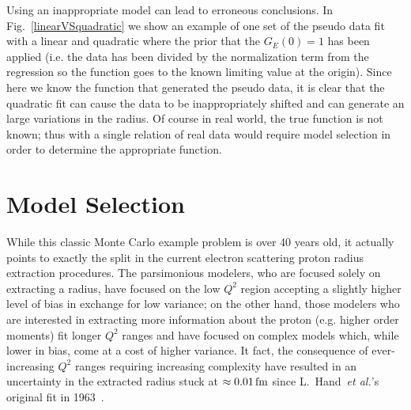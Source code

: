 \documentclass[10pt,superscriptaddress,aps,prc,twocolumn]{revtex4-1}
\begin{document}
Using an inappropriate model can lead to erroneous conclusions.
In Fig.~\ref{linearVSquadratic} we show an
example of one set of the pseudo data fit with a linear and quadratic where the prior that the
$G_E(0)=1$ has been applied (i.e. the data has been divided by the normalization term from the regression
so the function goes to the known limiting value at the origin).
Since here we know the function that generated the pseudo data, it is clear that the quadratic
fit can cause the data to be inappropriately shifted and can generate an large variations
in the radius. 
Of course in real world, the true function is not known; thus with a single relation of real data
would require model selection in order to determine the appropriate function. 

\section{Model Selection}

While this classic Monte Carlo example problem is over 40 years old, it actually points to exactly the split in 
the current electron scattering proton radius extraction procedures.     The parsimonious modelers, who are 
focused solely on extracting a radius, have focused on the low $Q^2$ region accepting a slightly higher 
level of bias in exchange for low variance; on the other hand, those modelers who are interested in extracting more information 
about the proton (e.g. higher order moments) fit longer $Q^2$ ranges and have
focused on complex models which, while lower in bias, come at a cost of higher variance.  
It fact, the consequence of ever-increasing $Q^2$ ranges requiring increasing complexity have resulted in
an uncertainty in the extracted radius 
stuck at $\approx \unit[0.01]{fm}$ since L.~Hand~\textit{et al.}'s original fit in 1963~\cite{Hand:1963zz}.
\end{document}
